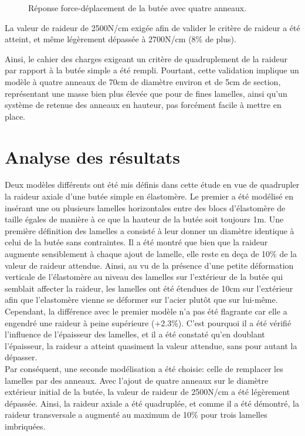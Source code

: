 ﻿\documentclass{article}
\begin{document}
\begin{figure}[!h]
	\centering
	\caption{Réponse force-déplacement de la butée avec quatre anneaux.}
	\label{fig36}
\end{figure}

La valeur de raideur de 2500N/cm exigée afin de valider le critère de raideur a été atteint, et même légèrement dépassée à 2700N/cm (8\% de plus).

Ainsi, le cahier des charges exigeant un critère de quadruplement de la raideur par rapport à la butée simple a été rempli. Pourtant, cette validation implique un modèle à quatre anneaux de 70cm de diamètre environ et de 5cm de section, représentant une masse bien plus élevée que pour de fines lamelles, ainsi qu'un système de retenue des anneaux en hauteur, pas forcément facile à mettre en place.


\section{Analyse des résultats}

Deux modèles différents ont été mis définis dans cette étude en vue de quadrupler la raideur axiale d'une butée simple en élastomère. Le premier a été modélisé en insérant une ou plusieurs lamelles horizontales entre des blocs d'élastomère de taille égales de manière à ce que la hauteur de la butée soit toujours 1m. Une première définition des lamelles a consisté à leur donner un diamètre identique à celui de la butée sans contraintes. Il a été montré que bien que la raideur augmente sensiblement à chaque ajout de lamelle, elle reste en deça de 10\% de la valeur de raideur attendue. Ainsi, au vu de la présence d'une petite déformation verticale de l'élastomère au niveau des lamelles sur l'extérieur de la butée qui semblait affecter la raideur, les lamelles ont été étendues de 10cm sur l'extérieur afin que l'elastomère vienne se déformer sur l'acier plutôt que sur lui-même. Cependant, la différence avec le premier modèle n'a pas été flagrante car elle a engendré une raideur à peine supérieure (+2.3\%). C'est pourquoi il a été vérifié l'influence de l'épaisseur des lamelles, et il a été constaté qu'en doublant l'épaisseur, la raideur a atteint quasiment la valeur attendue, sans pour autant la dépasser.
\\

Par conséquent, une seconde modélisation a été choisie: celle de remplacer les lamelles par des anneaux. Avec l'ajout de quatre anneaux sur le diamètre extérieur initial de la butée, la valeur de raideur de 2500N/cm a été légèrement dépassée. Ainsi, la raideur axiale a été quadruplée, et comme il a été démontré, la raideur transversale a augmenté au maximum de 10\% pour trois lamelles imbriquées.
\\
\end{document}
